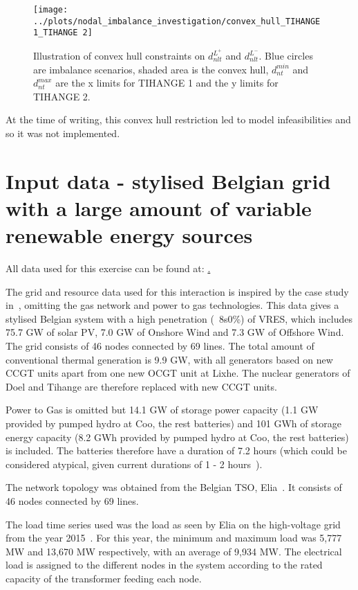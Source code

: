 \documentclass[number,times]{elsarticle}
\begin{document}
\begin{figure}[ht]
    \centering
    \texttt{[image: ../plots/nodal\_imbalance\_investigation/convex\_hull\_TIHANGE 1\_TIHANGE 2]}
    \caption{Illustration of convex hull constraints on $d_{nlt}^{L^+}$ and $d_{nlt}^{L^-}$. Blue circles are imbalance scenarios, shaded area is the convex hull, $d_{nt}^{min}$ and $d_{nt}^{max}$ are the x limits for TIHANGE 1 and the y limits for TIHANGE 2. \label{fig:convex_hull_tihange}}
\end{figure}

At the time of writing, this convex hull restriction led to model infeasibilities and so it was not implemented.

\section{Input data - stylised Belgian grid with a large amount of variable renewable energy sources} \label{sec:data}

All data used for this exercise can be found at: \href{https://www.dropbox.com/sh/mdvmc082gwng0tr/AABRyc3fZpxAFycmUfZmh8Csa?dl=0}.

The grid and resource data used for this interaction is inspired by the case study in~\cite{Belderbos2020}, omitting the gas network and power to gas technologies. This data gives a stylised Belgian system with a high penetration (~8s0\%) of \ac{VRES}, which includes 75.7 GW of solar PV, 7.0 GW of Onshore Wind and 7.3 GW of Offshore Wind. The grid consists of 46 nodes connected by 69 lines. The total amount of conventional thermal generation is 9.9 GW, with all generators based on new \ac{CCGT} units apart from one new \ac{OCGT} unit at Lixhe. The nuclear generators of Doel and Tihange are therefore replaced with new \ac{CCGT} units.

Power to Gas is omitted but 14.1 GW of storage power capacity (1.1 GW provided by pumped hydro at Coo, the rest batteries) and 101 GWh of storage energy capacity (8.2 GWh provided by pumped hydro at Coo, the rest batteries) is included. The batteries therefore have a duration of 7.2 hours (which could be considered atypical, given current durations of 1 - 2 hours~\cite{MITEI2022}).

The network topology was obtained from the Belgian TSO, Elia~\cite{Elia2018grid}. It consists of 46 nodes connected by 69 lines.

The load time series used was the load as seen by Elia on the high-voltage grid from the year 2015~\cite{Belderbos2020}. For this year, the minimum and maximum load was 5,777 MW and 13,670 MW respectively, with an average of 9,934 MW. The electrical load is assigned to the different nodes in the system according to the rated capacity of the transformer feeding each node.
\end{document}
